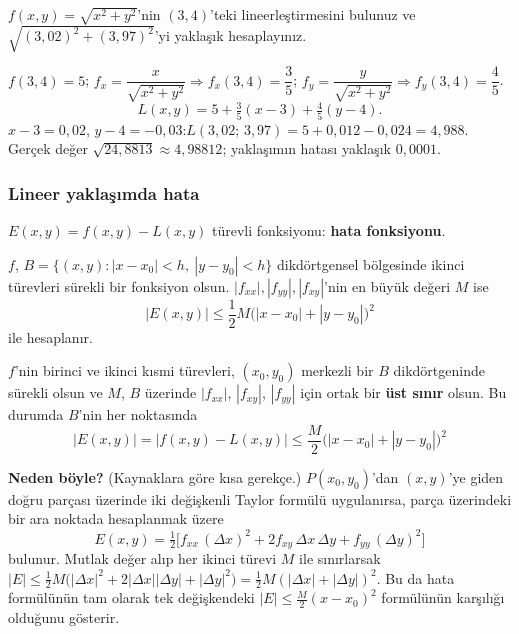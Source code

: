 \begin{soru}
$f(x,y)=\sqrt{x^2+y^2}$'nin $(3,4)$'teki lineerleştirmesini bulunuz ve $\sqrt{(3{,}02)^2+(3{,}97)^2}$'yi yaklaşık
hesaplayınız.
\end{soru}
\begin{cevap}
$f(3,4)=5$; $f_x=\dfrac{x}{\sqrt{x^2+y^2}}\Rightarrow f_x(3,4)=\dfrac35$; $f_y=\dfrac{y}{\sqrt{x^2+y^2}}\Rightarrow
f_y(3,4)=\dfrac45$.
\[ L(x,y)=5+\tfrac35(x-3)+\tfrac45(y-4). \]
$x-3=0{,}02$, $y-4=-0{,}03$:\quad $L(3{,}02;\,3{,}97)=5+0{,}012-0{,}024=4{,}988$.\\
Gerçek değer $\sqrt{24{,}8813}\approx4{,}98812$; yaklaşımın hatası yaklaşık $0{,}0001$.
\end{cevap}

\subsubsection{Lineer yaklaşımda hata}

\begin{tahta}
$E(x,y)=f(x,y)-L(x,y)$ türevli fonksiyonu: \textbf{hata fonksiyonu}.

$f$, $B=\{(x,y):|x-x_0|<h,\ |y-y_0|<h\}$ dikdörtgensel bölgesinde ikinci türevleri sürekli bir fonksiyon olsun.
$|f_{xx}|,|f_{yy}|,|f_{xy}|$'nin en büyük değeri $M$ ise
\[ |E(x,y)|\le\frac12M\big(|x-x_0|+|y-y_0|\big)^2 \]
ile hesaplanır.
\end{tahta}

\begin{teorem}
$f$'nin birinci ve ikinci kısmi türevleri, $(x_0,y_0)$ merkezli bir $B$ dikdörtgeninde sürekli olsun ve $M$,
$B$ üzerinde $|f_{xx}|$, $|f_{xy}|$, $|f_{yy}|$ için ortak bir \textbf{üst sınır} olsun. Bu durumda $B$'nin her
noktasında
\[
\boxed{\,|E(x,y)|=|f(x,y)-L(x,y)|\le\frac{M}{2}\big(|x-x_0|+|y-y_0|\big)^2\,}
\]
\end{teorem}

\textbf{Neden böyle?} (Kaynaklara göre kısa gerekçe.) $P(x_0,y_0)$'dan $(x,y)$'ye giden doğru parçası üzerinde
iki değişkenli Taylor formülü uygulanırsa, parça üzerindeki bir ara noktada hesaplanmak üzere
\[
E(x,y)=\tfrac12\Big[f_{xx}\,(\Delta x)^2+2f_{xy}\,\Delta x\,\Delta y+f_{yy}\,(\Delta y)^2\Big]
\]
bulunur. Mutlak değer alıp her ikinci türevi $M$ ile sınırlarsak
$|E|\le\tfrac12M\big(|\Delta x|^2+2|\Delta x||\Delta y|+|\Delta y|^2\big)=\tfrac12M(|\Delta x|+|\Delta y|)^2$.
Bu da hata formülünün tam olarak tek değişkendeki $|E|\le\frac M2(x-x_0)^2$ formülünün karşılığı olduğunu gösterir.

